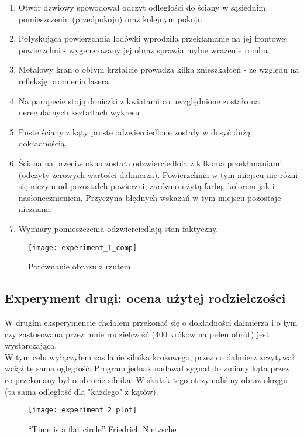 \begin{enumerate}
    \item Otwór dzwiowy spowodował odczyt odległości do ściany w sąsiednim pomieszczeniu (przedpokoju) oraz kolejnym pokoju.
    \item Połyskująca powierzchnia lodówki wprodziła przekłamanie na jej frontowej powierzchni - wygenerowany jej obraz sprawia mylne wrażenie rombu. 
    \item Metalowy kran o obłym krztałcie prowadza kilka znieszkałceń - ze względu na refleksję promienia lasera.
    \item Na parapecie stoją doniczki z kwiatami co uwzględnione zostało na neregularnych kształtach wykresu
    \item Puste ściany z kąty proste odzwierciedlone zostały w dosyć dużą dokładnością.
    \item Ściana na przeciw okna została odzwierciedlola z kilkoma przekłananiami (odczyty zerowych wartości dalmierza). Powierzchnia w tym miejscu nie różni się niczym od pozostałch powierzni, zarówno użytą farbą, kolorem jak i nasłonecznieniem. Przyczyna błędnych wskazań w tym miejscu pozostaje nieznana.
    \item Wymiary pomieszczenia odzwierciedlają stan faktyczny.
\end{enumerate}
\begin{figure}[h]
    \centering
    \texttt{[image: experiment\_1\_comp]}
    \caption{Porównanie obrazu z rzutem}
    \label{fig:experiment_1_comp}
\end{figure}


\newpage
\subsection {Experyment drugi: ocena użytej rodzielczości}

W drugim eksperymencie chciałem przekonać się o dokładności dalmierza i o tym czy zastosowana przez mnie rodzielczość (400 króków na pełen obrót) jest wystarczająca.\\

W tym celu wyłączyłem zasilanie silnika krokowego, przez co dalmierz zczytywał wciąż tę samą ogległość. Program jednak nadawał sygnał do zmiany kąta przez co przekonany był o obrocie silnika. W skutek tego otrzymaliśmy obraz okręgu (ta sama odległość dla "każdego" z kątów).

\begin{figure}[h]
    \centering
    \texttt{[image: experiment\_2\_plot]}
    \caption{“Time is a flat circle” Friedrich Nietzsche}
    \label{fig:experiment_2_plot}
\end{figure}

